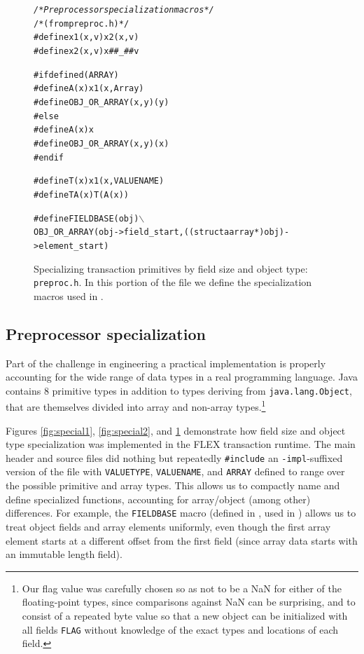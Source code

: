 \begin{figure}\sis\fontsize{8}{9}\begin{alltt}
\textit{/* Preprocessor specialization macros */}
/* (from preproc.h) */
#define x1(x,v) x2(x,v)
#define x2(x,v) x ## _ ## v

#if defined(ARRAY)
# define A(x) x1(x,Array)
# define OBJ_OR_ARRAY(x,y) (y)
#else
# define A(x) x
# define OBJ_OR_ARRAY(x,y) (x)
#endif

#define T(x) x1(x,VALUENAME)
#define TA(x) T(A(x))

#define FIELDBASE(obj) \(\backslash\)
         OBJ_OR_ARRAY(obj->field_start,((struct aarray *)obj)->element_start)
\end{alltt}
\caption[Specializing transaction primitives by field size and object
 type (\texttt{preproc.h}).]
{Specializing transaction primitives by field size and object
 type: \texttt{preproc.h}.  In this portion of the file we define the
 specialization macros used in .}
\label{fig:special3}
\end{figure}

\subsection{Preprocessor specialization}
Part of the challenge in engineering a practical implementation is
properly accounting for the wide range of data types in a real
programming language.  Java contains 8 primitive types in addition to
types deriving from \texttt{java.lang.Object},
that are themselves divided into array and non-array
types.\footnote{Our flag value was carefully chosen so as not to be a NaN for either
of the floating-point types, since comparisons against NaN can be
surprising, and to consist of a repeated byte value so that a new
object can be initialized with all fields \texttt{FLAG} without
knowledge of the exact types and locations of each field.}

Figures \ref{fig:special1}, \ref{fig:special2}, and \ref{fig:special3}
demonstrate how
field size and object type specialization was implemented in the FLEX
transaction runtime.  The main header and source files did nothing but
repeatedly \texttt{\#include} an \texttt{-impl}-suffixed version of
the file with \texttt{VALUETYPE}, \texttt{VALUENAME}, and
\texttt{ARRAY} defined to range over the possible primitive and array
types.  This allows us to compactly name and define specialized
functions, accounting for array/object (among other) differences.  For
example, the \texttt{FIELDBASE} macro (defined in ,
used in ) allows us to treat object fields
and array elements uniformly, even though the first array element
starts at a different offset from the first field (since array data starts with
an immutable length field).

